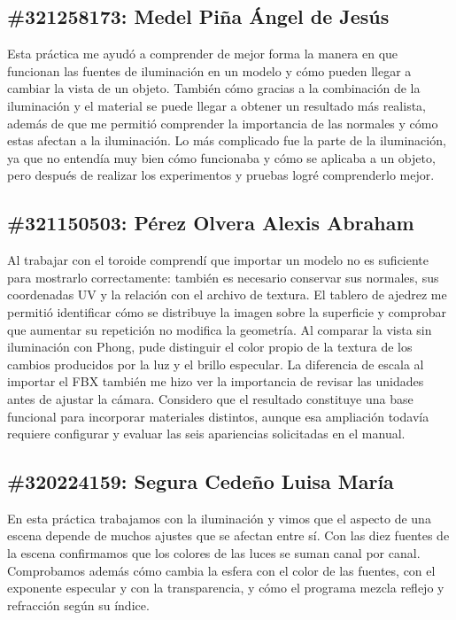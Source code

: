 \subsection*{\#321258173: Medel Piña Ángel de Jesús}
Esta práctica me ayudó a comprender de mejor forma la manera en que funcionan las fuentes de iluminación en un modelo y cómo pueden llegar a cambiar la vista de un objeto.
También cómo gracias a la combinación de la iluminación y el material se puede llegar a obtener un resultado más realista, además de que me permitió comprender la importancia de las normales y cómo estas afectan a la iluminación.
Lo más complicado fue la parte de la iluminación, ya que no entendía muy bien cómo funcionaba y cómo se aplicaba a un objeto, pero después de realizar los experimentos y pruebas logré comprenderlo mejor.

\subsection*{\#321150503: Pérez Olvera Alexis Abraham}
Al trabajar con el toroide comprendí que importar un modelo no es suficiente para mostrarlo correctamente: también es necesario conservar sus normales, sus coordenadas UV y la relación con el archivo de textura. El tablero de ajedrez me permitió identificar cómo se distribuye la imagen sobre la superficie y comprobar que aumentar su repetición no modifica la geometría. Al comparar la vista sin iluminación con Phong, pude distinguir el color propio de la textura de los cambios producidos por la luz y el brillo especular. La diferencia de escala al importar el FBX también me hizo ver la importancia de revisar las unidades antes de ajustar la cámara. Considero que el resultado constituye una base funcional para incorporar materiales distintos, aunque esa ampliación todavía requiere configurar y evaluar las seis apariencias solicitadas en el manual.

\subsection*{\#320224159: Segura Cedeño Luisa María}
En esta práctica trabajamos con la iluminación y vimos que el aspecto de una escena depende de muchos ajustes que se afectan entre sí. Con las diez fuentes de la escena confirmamos que los colores de las luces se suman canal por canal. Comprobamos además cómo cambia la esfera con el color de las fuentes, con el exponente especular y con la transparencia, y cómo el programa mezcla reflejo y refracción según su índice.

